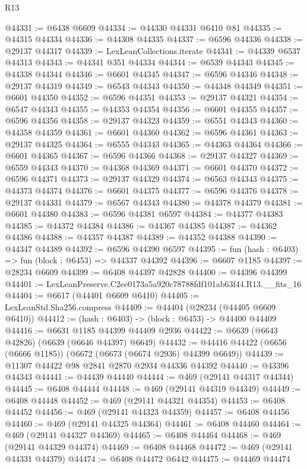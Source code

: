 \begin{lexlean}{R13}
\begin{coremodule}
@44331 := @6438 @6609
@44334 := @44330 @44331 @6410 @81
@44335 := @44315 @44334
@44336 := @44308 @44335
@44337 := @6596 @44336
@44338 := @29137 @44317
@44339 := LexLeanCollections.iterate
@44341 := @44339 @6537 @44313
@44343 := @44341 @351 @44334
@44344 := @6539 @44343
@44345 := @44338 @44344
@44346 := @6601 @44345
@44347 := @6596 @44346
@44348 := @29137 @44319
@44349 := @6543 @44343
@44350 := @44348 @44349
@44351 := @6601 @44350
@44352 := @6596 @44351
@44353 := @29137 @44321
@44354 := @6547 @44343
@44355 := @44353 @44354
@44356 := @6601 @44355
@44357 := @6596 @44356
@44358 := @29137 @44323
@44359 := @6551 @44343
@44360 := @44358 @44359
@44361 := @6601 @44360
@44362 := @6596 @44361
@44363 := @29137 @44325
@44364 := @6555 @44343
@44365 := @44363 @44364
@44366 := @6601 @44365
@44367 := @6596 @44366
@44368 := @29137 @44327
@44369 := @6559 @44343
@44370 := @44368 @44369
@44371 := @6601 @44370
@44372 := @6596 @44371
@44373 := @29137 @44329
@44374 := @6563 @44343
@44375 := @44373 @44374
@44376 := @6601 @44375
@44377 := @6596 @44376
@44378 := @29137 @44331
@44379 := @6567 @44343
@44380 := @44378 @44379
@44381 := @6601 @44380
@44383 := @6596 @44381 @6597
@44384 := @44377 @44383
@44385 := @44372 @44384
@44386 := @44367 @44385
@44387 := @44362 @44386
@44388 := @44357 @44387
@44389 := @44352 @44388
@44390 := @44347 @44389
@44392 := @6596 @44390 @6597
@44395 := fun (hash : @6403) => fun (block : @6453) => @44337 @44392
@44396 := @6607 @1185
@44397 := @28234 @6609
@44399 := @6408 @44397 @42828
@44400 := @44396 @44399
@44401 := LexLeanPreserve.C2ee0173a5a920c78788fdf101ab63f44.R13.__fits_16
@44404 := @6617 (@44401 @6609 @6410)
@44405 := LexLeanStd.Sha256.compress
@44409 := @44404 (@28234 (@44405 @6609 @6410))
@44412 := (hash : @6403) -> (block : @6453) -> @44400 @44409
@44416 := @6631 @1185 @44399 @44409 @2936
@44422 := @6639 (@6643 @42826) (@6639 (@6646 @44397) @6649)
@44432 := @44416 @44422 (@6656 (@6666 @1185)) (@6672 (@6673 (@6674 @2936) @44399 @6649))
@44439 := @11307 @44422 @98 @2841 @2870 @2934 @44336 @44392
@44440 := @43396 @44343
@44441 := @44439 @44440
@44444 := @469 (@29141 @44317 @44344)
@44445 := @6408 @44444
@44448 := @469 (@29141 @44319 @44349)
@44449 := @6408 @44448
@44452 := @469 (@29141 @44321 @44354)
@44453 := @6408 @44452
@44456 := @469 (@29141 @44323 @44359)
@44457 := @6408 @44456
@44460 := @469 (@29141 @44325 @44364)
@44461 := @6408 @44460
@44464 := @469 (@29141 @44327 @44369)
@44465 := @6408 @44464
@44468 := @469 (@29141 @44329 @44374)
@44469 := @6408 @44468
@44472 := @469 (@29141 @44331 @44379)
@44474 := @6408 @44472 @6442
@44475 := @44469 @44474

\end{coremodule}
\end{lexlean}
